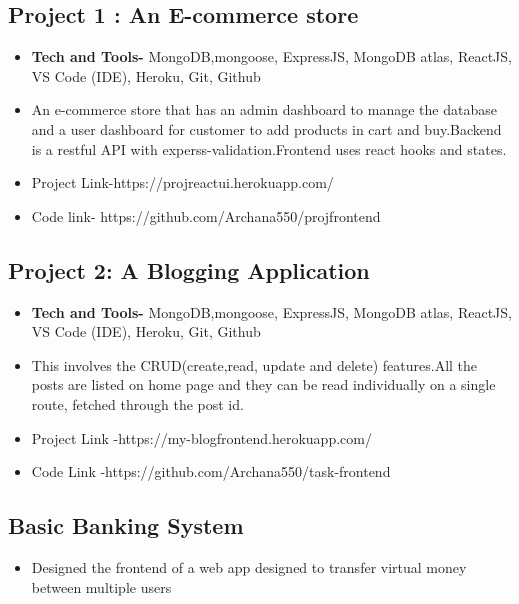 \documentclass[a4,10pt]{article}
\newenvironment{zitemize}{
\begin{itemize}\itemsep2pt \parskip0pt \parsep1pt}
{\end{itemize}\vspace{-0.5cm}}
\newcommand{\hskills}[1]{
\textbf{\bfseries #1} }
\begin{document}
\subsection*{Project 1 : An E-commerce store \hfill} 
    \begin{zitemize}
        \item \hskills{Tech and Tools-}MongoDB,mongoose, ExpressJS, MongoDB atlas, ReactJS, VS Code (IDE), Heroku, Git, Github
        \item An e-commerce store that has an admin dashboard to manage the database and a user dashboard for customer to add products in cart and buy.Backend is a restful API with experss-validation.Frontend uses react hooks and states.
        \item Project Link-https://projreactui.herokuapp.com/
\item Code link- https://github.com/Archana550/projfrontend
    \end{zitemize}


\subsection*{Project 2: A Blogging Application} 
    \begin{zitemize}
          \item \hskills{Tech and Tools-}MongoDB,mongoose, ExpressJS, MongoDB atlas, ReactJS, VS Code (IDE), Heroku, Git, Github
        \item This involves the CRUD(create,read, update and delete) features.All the posts are listed on home page and they can be read individually on a single route, fetched through the post id.
        \item Project Link -https://my-blogfrontend.herokuapp.com/
\item Code Link -https://github.com/Archana550/task-frontend
    \end{zitemize}
\subsection*{Basic Banking System} 
    \begin{zitemize}
         
        \item Designed the frontend of a web app designed to transfer virtual money between multiple users
    \end{zitemize}
\end{document}
